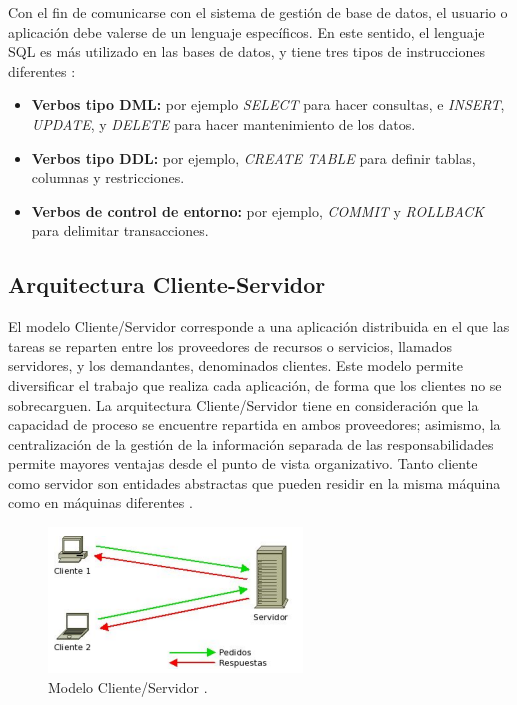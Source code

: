 Con el fin de comunicarse con el sistema de gestión de base de datos, el usuario o aplicación debe valerse de un lenguaje específicos. En este sentido, el lenguaje SQL es más utilizado en las bases de datos, y tiene tres tipos de instrucciones diferentes \citep{camps2005}:

\begin{itemize}
\item \textbf{Verbos tipo DML:} por ejemplo \textit{SELECT} para hacer consultas, e \textit{INSERT}, \textit{UPDATE}, y \textit{DELETE} para hacer mantenimiento de los datos.
\item \textbf{Verbos tipo DDL:} por ejemplo, \textit{CREATE TABLE} para definir tablas, columnas y restricciones.
\item \textbf{Verbos de control de entorno:} por ejemplo, \textit{COMMIT} y \textit{ROLLBACK} para delimitar transacciones.
\end{itemize}

\subsection{Arquitectura Cliente-Servidor}

El modelo Cliente/Servidor corresponde a una aplicación distribuida en el que las tareas se reparten entre los proveedores de recursos o servicios, llamados servidores, y los demandantes, denominados clientes. Este modelo permite diversificar el trabajo que realiza cada aplicación, de forma que los clientes no se sobrecarguen. La arquitectura Cliente/Servidor tiene en consideración que la capacidad de proceso se encuentre repartida en ambos proveedores; asimismo, la centralización de la gestión de la información separada de las responsabilidades permite mayores ventajas desde el punto de vista organizativo. Tanto cliente como servidor son entidades abstractas que pueden residir en la misma máquina como en máquinas diferentes \citep{marini2012}.

\begin{figure}[H]
\centering
\includegraphics[scale=1]{images/clienteservidor.png}
\caption{Modelo Cliente/Servidor \citep{marini2012}.}
\end{figure}

